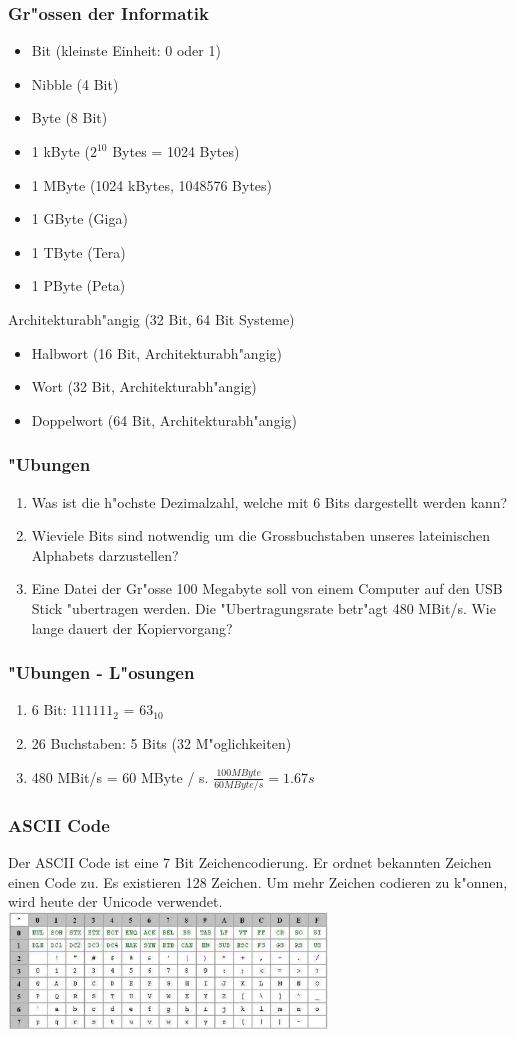 \documentclass{beamer}
\begin{document}
\frame
{
	\frametitle{Gr"ossen der Informatik}
	{\small
	\begin{itemize}
	\item Bit (kleinste Einheit: 0 oder 1)
	\item Nibble (4 Bit)
	\item Byte (8 Bit)
	\item 1 kByte ($2^{10}$ Bytes = 1024 Bytes)
	\item 1 MByte (1024 kBytes, 1048576 Bytes)
	\item 1 GByte (Giga)
	\item 1 TByte (Tera)
	\item 1 PByte (Peta)
	\end{itemize}
	Architekturabh"angig (32 Bit, 64 Bit Systeme)
	\begin{itemize}
	\item Halbwort (16 Bit, Architekturabh"angig)
	\item Wort (32 Bit, Architekturabh"angig)
	\item Doppelwort (64 Bit, Architekturabh"angig)
	\end{itemize}
	}
}

\frame
{
	\frametitle{"Ubungen}
	\begin{enumerate}
	\item Was ist die h"ochste Dezimalzahl, welche mit 6 Bits dargestellt werden kann?
	\item Wieviele Bits sind notwendig um die Grossbuchstaben unseres lateinischen Alphabets darzustellen?
	\item Eine Datei der Gr"osse 100 Megabyte soll von einem Computer auf den USB Stick
	"ubertragen werden. Die "Ubertragungsrate betr"agt 480 MBit/s. Wie lange dauert der Kopiervorgang?
	\end{enumerate}
}

\frame
{
	\frametitle{"Ubungen - L"osungen}
	\begin{enumerate}
	\item 6 Bit: $111111_2$ = $63_{10}$
	\item 26 Buchstaben: 5 Bits (32 M"oglichkeiten)
	\item 480 MBit/s = 60 MByte / s. $\frac{100 MByte}{60 MByte/s} = 1.67s$
	\end{enumerate}
}

\frame
{
	\frametitle{ASCII Code}
	Der ASCII Code ist eine 7 Bit Zeichencodierung. Er ordnet bekannten Zeichen
	einen Code zu. Es existieren 128 Zeichen. Um mehr Zeichen codieren zu k"onnen,
	wird heute der Unicode verwendet.\\
	\includegraphics[width=240pt]{ascii.eps}
}
\end{document}
